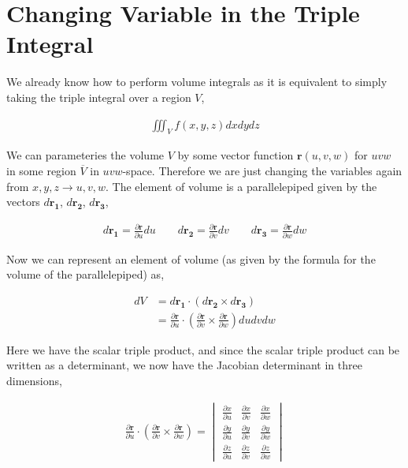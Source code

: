 \documentclass[11pt]{amsart}
\begin{document}
\section{Changing Variable in the Triple Integral}

We already know how to perform volume integrals as it is equivalent to simply taking the triple integral over a region $V$,

\begin{align*}
  \iiint_V f(x, y, z) dx dy dz
\end{align*}

We can parameteries the volume $V$ by some vector function $\mathbf{r}(u, v, w)$ for $uvw$ in some region $\overline{V}$ in $uvw$-space. Therefore we are just changing the variables again from $x, y, z \to u, v, w$. The element of volume is a parallelepiped given by the vectors $d\mathbf{r_1}$, $d\mathbf{r_2}$, $d\mathbf{r_3}$,

\begin{align*}
  d\mathbf{r_1} = \frac{\partial \mathbf{r}}{\partial u} du
  \qquad d\mathbf{r_2} = \frac{\partial \mathbf{r}}{\partial v} dv
  \qquad d\mathbf{r_3} = \frac{\partial \mathbf{r}}{\partial w} dw
\end{align*}

Now we can represent an element of volume (as given by the formula for the volume of the parallelepiped) as,

\begin{align*}
  dV &= d\mathbf{r_1} \cdot \left(d\mathbf{r_2} \times d\mathbf{r_3}\right) \\
     &= \frac{\partial \mathbf{r}}{\partial u} \cdot \left(\frac{\partial \mathbf{r}}{\partial v} \times \frac{\partial \mathbf{r}}{\partial w}\right) du dv dw
\end{align*}

Here we have the scalar triple product, and since the scalar triple product can be written as a determinant, we now have the Jacobian determinant in three dimensions,

\begin{align*}
  \frac{\partial \mathbf{r}}{\partial u} \cdot \left(\frac{\partial \mathbf{r}}{\partial v} \times \frac{\partial \mathbf{r}}{\partial w}\right) =
  \begin{vmatrix}
    \frac{\partial x}{\partial u} & \frac{\partial x}{\partial v} & \frac{\partial x}{\partial w} \\[6pt]
    \frac{\partial y}{\partial u} & \frac{\partial y}{\partial v} & \frac{\partial y}{\partial w} \\[6pt]
    \frac{\partial z}{\partial u} & \frac{\partial z}{\partial v} & \frac{\partial z}{\partial w}
  \end{vmatrix}
\end{align*}
\end{document}
